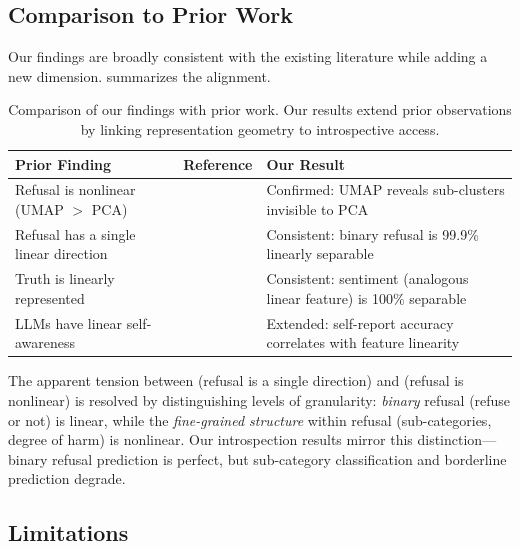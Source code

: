 \subsection{Comparison to Prior Work}

Our findings are broadly consistent with the existing literature while adding a new dimension.  summarizes the alignment.

\begin{table}[t]
    \centering
    \caption{Comparison of our findings with prior work. Our results extend prior observations by linking representation geometry to introspective access.}
    \begin{tabular}{@{}p{3.8cm}p{4.2cm}p{4.2cm}@{}}
        \toprule
        Prior Finding & Reference & Our Result \\
        \midrule
        Refusal is nonlinear (UMAP $>$ PCA) & \citet{hildebrandt2025refusal} & Confirmed: UMAP reveals sub-clusters invisible to PCA \\
        \addlinespace
        Refusal has a single linear direction & \citet{arditi2024refusal} & Consistent: binary refusal is 99.9\% linearly separable \\
        \addlinespace
        Truth is linearly represented & \citet{marks2023geometry} & Consistent: sentiment (analogous linear feature) is 100\% separable \\
        \addlinespace
        LLMs have linear self-awareness & \citet{tamoyan2025factual} & Extended: self-report accuracy correlates with feature linearity \\
        \bottomrule
    \end{tabular}
    \label{tab:comparison}
\end{table}

The apparent tension between \citet{arditi2024refusal} (refusal is a single direction) and \citet{hildebrandt2025refusal} (refusal is nonlinear) is resolved by distinguishing levels of granularity: \emph{binary} refusal (refuse or not) is linear, while the \emph{fine-grained structure} within refusal (sub-categories, degree of harm) is nonlinear. Our introspection results mirror this distinction---binary refusal prediction is perfect, but sub-category classification and borderline prediction degrade.

\subsection{Limitations}

